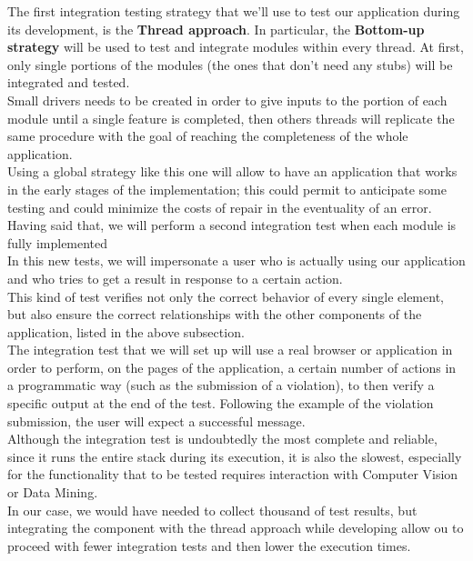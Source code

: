 The first integration testing strategy that we'll use to test our application during its development, is the \textbf{Thread approach}. In particular, the \textbf{Bottom-up strategy} will be used to test and integrate modules within every thread. At first, only single portions of the modules (the ones that don't need any stubs) will be integrated and tested.
\\Small drivers needs to be created in order to give inputs to the portion of each module until a single feature is completed, then others threads will replicate the same procedure with the goal of reaching the completeness of the whole application.
\\Using a global strategy like this one will allow to have an application that works in the early stages of the implementation; this could permit to anticipate some testing and could minimize the costs of repair in the eventuality of an error.
\\Having said that, we will perform a second integration test when each module is fully implemented
\\In this new tests, we will impersonate a user who is actually using our application and who tries to get a result in response to a certain action.
\\This kind of test verifies not only the correct behavior of every single element, but also ensure the correct relationships with the other components of the application, listed in the above subsection.
\\The integration test that we will set up will use a real browser or application in order to perform, on the pages of the application, a certain number of actions in a programmatic way (such as the submission of a violation), to then verify a specific output at the end of the test. Following the example of the violation submission, the user will expect a successful message.
\\Although the integration test is undoubtedly the most complete and reliable, since it runs the entire stack during its execution, it is also the slowest, especially for the functionality that to be tested requires interaction with Computer Vision or Data Mining.
\\In our case, we would have needed to collect thousand of test results, but integrating the component with the thread approach while developing allow ou to proceed with fewer integration tests and then lower the execution times.

